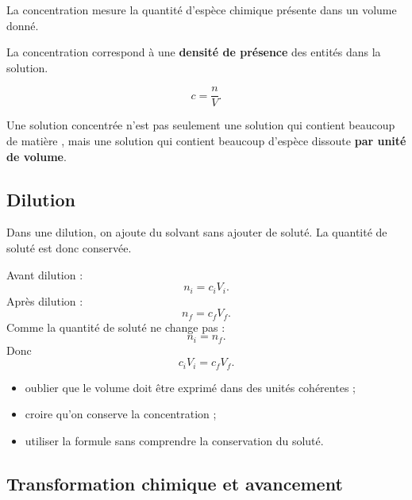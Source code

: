\documentclass[11pt,a4paper]{article}
\begin{document}
\begin{sens}
La concentration mesure la quantité d'espèce chimique présente dans un volume donné.
\end{sens}

\begin{imagem}
La concentration correspond à une \textbf{densité de présence} des entités dans la solution.
\end{imagem}

\begin{bilan}
\[
c=\frac{n}{V}.
\]
\end{bilan}

\begin{fausseintuition}
Une solution concentrée n'est pas seulement une solution qui contient \og beaucoup de matière \fg,
mais une solution qui contient beaucoup d'espèce dissoute \textbf{par unité de volume}.
\end{fausseintuition}

\subsection{Dilution}

\begin{modele}
Dans une dilution, on ajoute du solvant sans ajouter de soluté.
La quantité de soluté est donc conservée.
\end{modele}

\begin{demo}
Avant dilution :
\[
n_i=c_iV_i.
\]
Après dilution :
\[
n_f=c_fV_f.
\]
Comme la quantité de soluté ne change pas :
\[
n_i=n_f.
\]
Donc
\[
c_iV_i=c_fV_f.
\]
\end{demo}

\begin{erreurs}
\begin{itemize}
    \item oublier que le volume doit être exprimé dans des unités cohérentes ;
    \item croire qu'on conserve la concentration ;
    \item utiliser la formule sans comprendre la conservation du soluté.
\end{itemize}
\end{erreurs}

\subsection{Transformation chimique et avancement}
\end{document}
